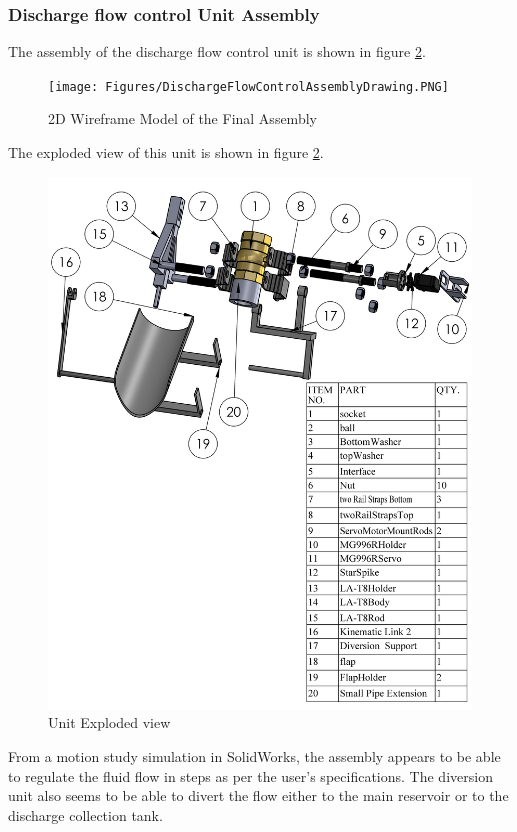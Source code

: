 \subsubsection{Discharge flow control Unit Assembly}
The assembly of the discharge flow control unit is shown in figure \ref{fig:unit_exploded_view}.
\begin{figure}[H]
    \centering
    \texttt{[image: Figures/DischargeFlowControlAssemblyDrawing.PNG]}
    \caption{2D Wireframe Model of the Final Assembly}
    \label{fig:final assembly}
\end {figure}
The exploded view of this unit is shown in figure \ref{fig:unit_exploded_view}.
\begin{figure}[H]
    \centering
    \includegraphics{Figures/DischargeFlowControlAssemblyExploded.PNG}
    \caption{Unit Exploded view}
    \label{fig:unit_exploded_view}
\end{figure}
From a motion study simulation in SolidWorks, the assembly appears to be able to regulate the fluid flow in steps as per the user's specifications. The diversion unit also seems to be able to divert the flow either to the main reservoir or to the discharge collection tank.

